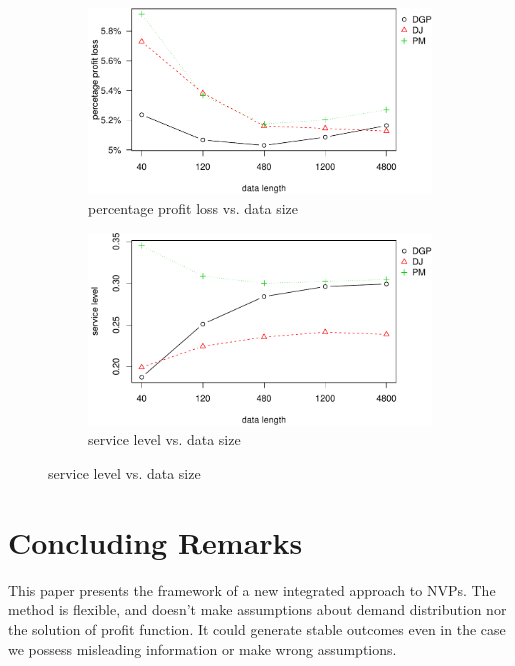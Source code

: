 \documentclass{article}
\begin{document}
\begin{figure}[ht]
\centering
\caption{Performance vs. data size with Laplace distributed error term}
\begin{subfigure}[b]{0.48\textwidth}
\centering
\includegraphics[width=\textwidth]{runif-plot_files/figure-latex/ppl-1.pdf}
\caption{percentage profit loss vs. data size}
\end{subfigure}
\hfill
\begin{subfigure}[b]{0.48\textwidth}
\centering
\includegraphics[width=\textwidth]{runif-plot_files/figure-latex/sl-1.pdf}
\caption{service level vs. data size}
\end{subfigure}
\label{fig:err}
\end{figure}

\section{Concluding Remarks} \label{se:end}
This paper presents the framework of a new integrated approach to NVPs. The method is flexible, and doesn't make assumptions about demand distribution nor the solution of profit function. It could generate stable outcomes even in the case we possess misleading information or make wrong assumptions.
\end{document}
